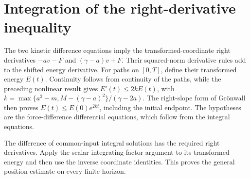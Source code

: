 \documentclass[11pt,a4paper]{article}
\begin{document}
\section{\texorpdfstring{Integration of the right-derivative inequality}{Integration of the right-derivative inequality}}


The two kinetic difference equations imply the transformed-coordinate right derivatives \(-av-F\) and \((\gamma-a)v+F\). Their squared-norm derivative rules add to the shifted energy derivative. For paths on \([0,T]\), define their transformed energy \(E(t)\). Continuity follows from continuity of the paths, while the preceding nonlinear result gives \(E'(t)\le2kE(t)\), with \(k=\max\{a^2-m,M-(\gamma-a)^2\}/(\gamma-2a)\). The right-slope form of Grönwall then proves \(E(t)\le E(0)e^{2kt}\), including the initial endpoint. The hypotheses are the force-difference differential equations, which follow from the integral equations.



The difference of common-input integral solutions has the required right derivatives. Apply the scalar integrating-factor argument to its transformed energy and then use the inverse coordinate identities. This proves the general position estimate on every finite horizon.
\end{document}
